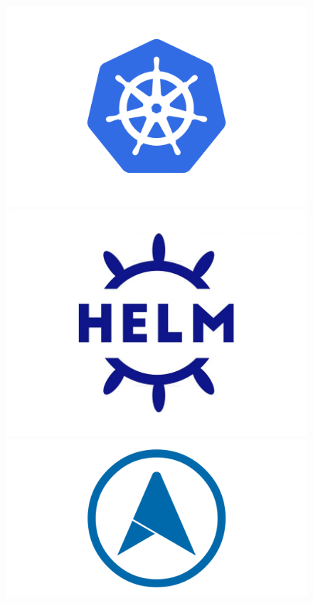 \documentclass{beamer}
\begin{document}
\begin{frame}
\begin{columns}
        \begin{figure}
            \includegraphics[height=0.25\textheight]{images/other/kubernetes-logo}
            \includegraphics[height=0.25\textheight]{images/other/helm-logo}
            \includegraphics[height=0.2\textheight]{images/other/metallb-logo}
        \end{figure}

    \end{columns}
\end{frame}
\end{document}
